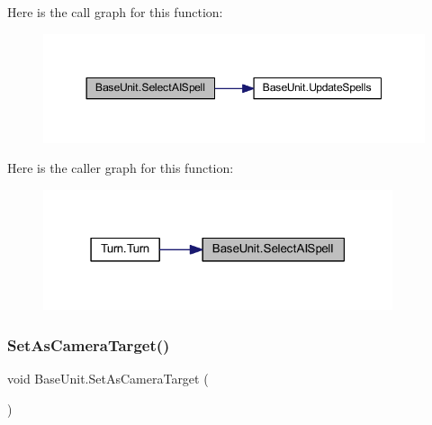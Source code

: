 Here is the call graph for this function\+:
\nopagebreak
\begin{figure}[H]
\begin{center}
\leavevmode
\includegraphics[width=350pt]{class_base_unit_a94ba01b61de9b22ba2431a47caf13cd5_cgraph}
\end{center}
\end{figure}
Here is the caller graph for this function\+:
\nopagebreak
\begin{figure}[H]
\begin{center}
\leavevmode
\includegraphics[width=291pt]{class_base_unit_a94ba01b61de9b22ba2431a47caf13cd5_icgraph}
\end{center}
\end{figure}
\mbox{\label{class_base_unit_ac4b2eaeb4641fc124d36d413b6193c56}} 
\subsubsection{\texorpdfstring{SetAsCameraTarget()}{SetAsCameraTarget()}}
{\footnotesize\ttfamily void Base\+Unit.\+Set\+As\+Camera\+Target (\begin{DoxyParamCaption}{ }\end{DoxyParamCaption})}

